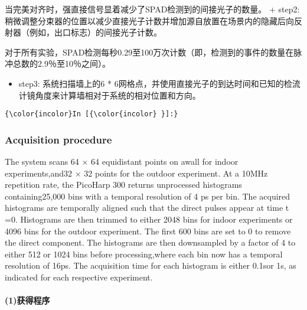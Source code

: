 \documentclass[11pt]{article}
\providecommand{\tightlist}{%
      \setlength{\itemsep}{0pt}\setlength{\parskip}{0pt}}
\begin{document}
当完美对齐时，强直接信号显着减少了SPAD检测到的间接光子的数量。 + step2:
稍微调整分束器的位置以减少直接光子计数并增加源自放置在场景内的隐藏后向反射器（例如，出口标志）的间接光子计数。

对于所有实验，SPAD检测每秒0.29至100万次计数（即，检测到的事件的数量在脉冲总数的2.9％至10％之间）。

\begin{itemize}
\tightlist
\item
  step3: 系统扫描墙上的6 *
  6网格点，并使用直接光子的到达时间和已知的检流计镜角度来计算墙相对于系统的相对位置和方向。
\end{itemize}

    \begin{Verbatim}[commandchars=\\\{\}]
{\color{incolor}In [{\color{incolor} }]:} 
\end{Verbatim}


    \subsubsection{Acquisition procedure}\label{acquisition-procedure}

The system scans 64 \(\times\) 64 equidistant points on awall for indoor
experiments,and32 \(\times\) 32 points for the outdoor experiment. At a
10MHz repetition rate, the PicoHarp 300 returns unprocessed histograms
containing25,000 bins with a temporal resolution of 4 ps per bin. The
acquired histograms are temporally aligned such that the direct pulses
appear at time t =0. Histograms are then trimmed to either 2048 bins for
indoor experiments or 4096 bins for the outdoor experiment. The ﬁrst 600
bins are set to 0 to remove the direct component. The histograms are
then downsampled by a factor of 4 to either 512 or 1024 bins before
processing,where each bin now has a temporal resolution of 16ps. The
acquisition time for each histogram is either 0.1sor 1s, as indicated
for each respective experiment.

    \paragraph{(1)获得程序}\label{ux83b7ux5f97ux7a0bux5e8f}
\end{document}

